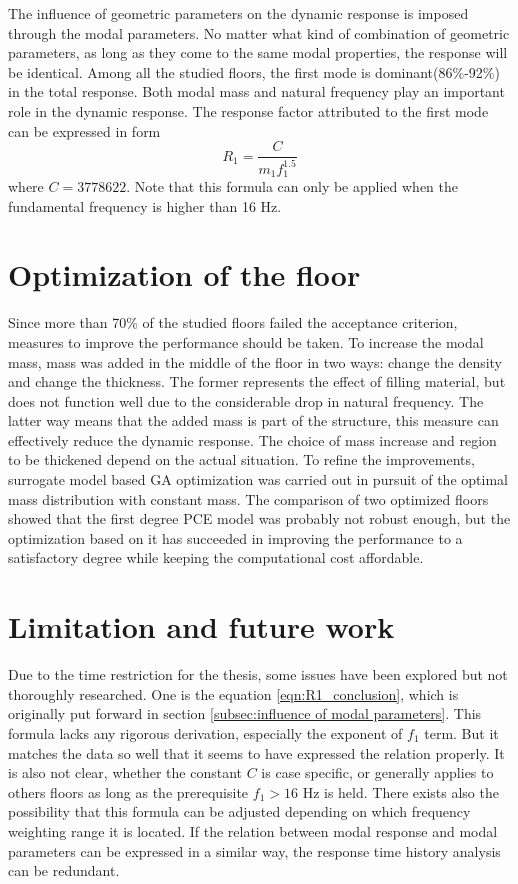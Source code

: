The influence of geometric parameters on the dynamic response is imposed through the modal parameters. No matter what kind of combination of geometric parameters, as long as they come to the same modal properties, the response will be identical. Among all the studied floors, the first mode is dominant(86\%-92\%) in the total response. Both modal mass and natural frequency play an important role in the dynamic response. The response factor attributed to the first mode can be expressed in form
\begin{equation}
\label{eqn:R1_conclusion}
	R_1=\frac{C}{m_1f_1^{1.5}}
\end{equation}
\noindent
where $C=3778622$. Note that this formula can only be applied when the fundamental frequency is higher than 16 Hz. 

\section{Optimization of the floor}
Since more than 70\% of the studied floors failed the acceptance criterion, measures to improve the performance should be taken. To increase the modal mass, mass was added in the middle of the floor in two ways: change the density and change the thickness. The former represents the effect of filling material, but does not function well due to the considerable drop in natural frequency. The latter way means that the added mass is part of the structure, this measure can effectively reduce the dynamic response. The choice of mass increase and region to be thickened depend on the actual situation. To refine the improvements, surrogate model based GA optimization was carried out in pursuit of the optimal mass distribution with constant mass. The comparison of two optimized floors showed that the first degree PCE model was probably not robust enough, but the optimization based on it has succeeded in improving the performance to a satisfactory degree while keeping the computational cost affordable. 


\section{Limitation and future work}
Due to the time restriction for the thesis, some issues have been explored but not thoroughly researched. One is the equation \ref{eqn:R1_conclusion}, which is originally put forward in section \ref{subsec:influence of modal parameters}. This formula lacks any rigorous derivation, especially the exponent of $f_1$ term. But it matches the data so well that it seems to have expressed the relation properly. It is also not clear, whether the constant $C$ is case specific, or generally applies to others floors as long as the prerequisite $f_1>16$ Hz is held. There exists also the possibility that this formula can be adjusted depending on which frequency weighting range it is located. If the relation between modal response and modal parameters can be expressed in a similar way, the response time history analysis can be redundant.

